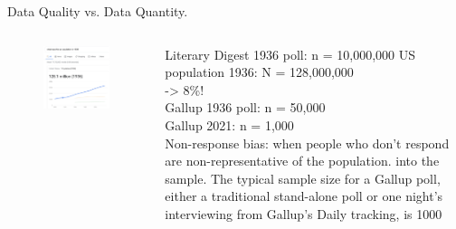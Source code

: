 \documentclass[aspectratio=169]{../latex_main/tntbeamer}  %
\begin{document}
		\begin{frame}{Data Quality vs. Data Quantity.}
	    \begin{columns}
	        \begin{column}{.5\textwidth}
	           \begin{figure}
	               \includegraphics[scale=.37]{Bild8}
	           \end{figure}
	        \end{column}
	        
	        \begin{column}{.5\textwidth}
	            Literary Digest 1936 poll: n = 10,000,000
                US population 1936: N = 128,000,000\\
                \hspace{1cm}-> 8\%! \\
	            \bigskip
	            Gallup 1936 poll: n = 50,000\\
                Gallup 2021: n = 1,000\\
	            \bigskip
	            Non-response bias: when people who don’t respond are non-representative of the population.
	            \bigskip
	            into the sample. The typical sample size for a Gallup poll, either a traditional stand-alone poll or one night's interviewing from Gallup's Daily tracking, is 1000
	        \end{column}
	        
	    \end{columns}
	    
	\end{frame}
	
\end{document}
